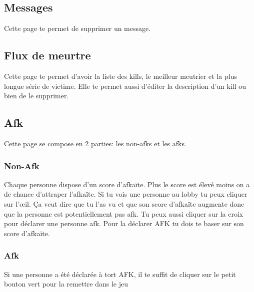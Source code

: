 \documentclass[12pt]{article}
\begin{document}
\subsection{Messages}
Cette page te permet de supprimer un message.

\subsection{Flux de meurtre}
Cette page te permet d'avoir la liste des kills, le meilleur meutrier et la plus longue série de victime. Elle te permet aussi d'éditer la description d'un kill ou bien de le supprimer.

\subsection{Afk}
Cette page se compose en 2 parties: les non-afks et les afks.
\subsubsection{Non-Afk}
Chaque personne dispose d'un score d'afkaïte. Plus le score est élevé moins on a de chance d'attraper l'afkaïte. Si tu vois une personne au lobby tu peux cliquer sur l'œil. Ça veut dire que tu l'as vu et que son score d'afkaïte augmente donc que la personne est potentiellement pas afk. Tu peux aussi cliquer sur la croix pour déclarer une personne afk. Pour la déclarer AFK tu dois te baser sur son score d'afkaïte.

\subsubsection{Afk}
Si une personne a été déclarée à tort AFK, il te suffit de cliquer sur le petit bouton vert pour la remettre dans le jeu
\end{document}
